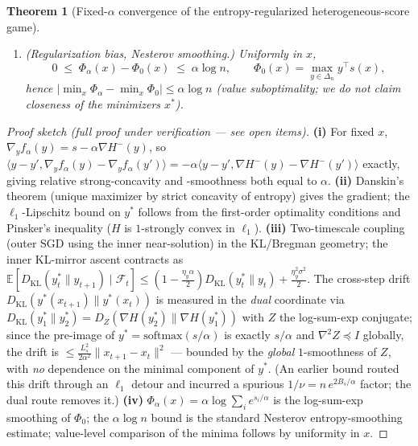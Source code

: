 \documentclass[11pt]{article}
\newtheorem{theorem}{Theorem}
\newcommand{\expect}{\mathbb{E}}
\newcommand{\simplex}{\Delta}
\newcommand{\param}{x}             %
\newcommand{\dist}{y}              %
\newcommand{\score}{s}             %
\newcommand{\entropy}{H}
\begin{document}
\begin{theorem}[Fixed-$\alpha$ convergence of the entropy-regularized heterogeneous-score game]
\begin{enumerate}[topsep=2pt,itemsep=1pt,label=\textup{(\roman*)}]
  \item \textup{(Regularization bias, Nesterov smoothing.)} Uniformly in $\param$,
  \begin{equation}
    0 \;\le\; \Phi_\alpha(\param)-\Phi_0(\param)\;\le\;\alpha\log n,
    \qquad \Phi_0(\param)=\max_{\dist\in\simplex_n}\dist^{\top}\score(\param),
    \label{eq:bias}
  \end{equation}
  hence $\big|\min_\param\Phi_\alpha-\min_\param\Phi_0\big|\le\alpha\log n$ (\emph{value} suboptimality; we do not claim closeness of the minimizers $\param^{*}$).
\end{enumerate}
\end{theorem}

\begin{proof}[Proof sketch (full proof under verification --- see open items)]
\textbf{(i)} For fixed $\param$, $\nabla_\dist f_\alpha(\dist)=\score-\alpha\nabla\entropy^{-}(\dist)$, so $\langle\dist-\dist',\nabla_\dist f_\alpha(\dist)-\nabla_\dist f_\alpha(\dist')\rangle=-\alpha\langle\dist-\dist',\nabla\entropy^{-}(\dist)-\nabla\entropy^{-}(\dist')\rangle$ exactly, giving relative strong-concavity and -smoothness both equal to $\alpha$. \textbf{(ii)} Danskin's theorem (unique maximizer by strict concavity of entropy) gives the gradient; the $\ell_1$-Lipschitz bound on $\dist^{*}$ follows from the first-order optimality conditions and Pinsker's inequality ($\entropy$ is $1$-strongly convex in $\ell_1$). \textbf{(iii)} Two-timescale coupling (outer SGD using the inner near-solution) in the KL/Bregman geometry; the inner KL-mirror ascent contracts as $\expect[D_{\mathrm{KL}}(\dist^{*}_t\|\dist_{t+1})\mid\mathcal{F}_t]\le(1-\tfrac{\eta_\dist\alpha}{2})D_{\mathrm{KL}}(\dist^{*}_t\|\dist_t)+\tfrac{\eta_\dist^2\sigma^2}{2}$. The cross-step drift $D_{\mathrm{KL}}(\dist^{*}(\param_{t+1})\|\dist^{*}(\param_t))$ is measured in the \emph{dual} coordinate via $D_{\mathrm{KL}}(\dist^*_1\|\dist^*_2)=D_Z(\nabla\entropy(\dist^*_2)\|\nabla\entropy(\dist^*_1))$ with $Z$ the log-sum-exp conjugate; since the pre-image of $\dist^{*}=\mathrm{softmax}(\score/\alpha)$ is exactly $\score/\alpha$ and $\nabla^2 Z\preceq I$ globally, the drift is $\le\tfrac{L_s^2}{2\alpha^2}\|\param_{t+1}-\param_t\|^2$ --- bounded by the \emph{global} $1$-smoothness of $Z$, with \emph{no} dependence on the minimal component of $\dist^{*}$. (An earlier bound routed this drift through an $\ell_1$ detour and incurred a spurious $1/\nu=n\,e^{2B_s/\alpha}$ factor; the dual route removes it.) \textbf{(iv)} $\Phi_\alpha(\param)=\alpha\log\sum_i e^{\score_i/\alpha}$ is the log-sum-exp smoothing of $\Phi_0$; the $\alpha\log n$ bound is the standard Nesterov entropy-smoothing estimate; value-level comparison of the minima follows by uniformity in $\param$.
\end{proof}
\end{document}
